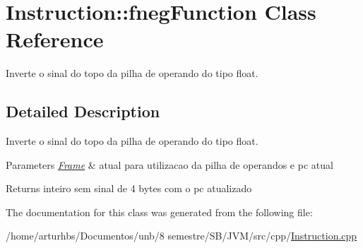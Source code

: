 \hypertarget{classInstruction_1_1fnegFunction}{}\section{Instruction\+:\+:fneg\+Function Class Reference}
\label{classInstruction_1_1fnegFunction}


Inverte o sinal do topo da pilha de operando do tipo float.  




\subsection{Detailed Description}
Inverte o sinal do topo da pilha de operando do tipo float. 


\begin{DoxyParams}{Parameters}
{\em \hyperlink{classFrame}{Frame}} & atual para utilizacao da pilha de operandos e pc atual \\
\hline
\end{DoxyParams}
\begin{DoxyReturn}{Returns}
inteiro sem sinal de 4 bytes com o pc atualizado 
\end{DoxyReturn}


The documentation for this class was generated from the following file\+:\begin{DoxyCompactItemize}
\item 
/home/arturhbs/\+Documentos/unb/8 semestre/\+S\+B/\+J\+V\+M/src/cpp/\hyperlink{Instruction_8cpp}{Instruction.\+cpp}\end{DoxyCompactItemize}
